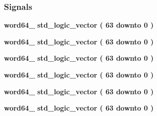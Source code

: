 \subsubsection*{Signals}
 \begin{DoxyCompactItemize}
\item 
{\bf word64\+\_} {\bfseries \textcolor{comment}{std\+\_\+logic\+\_\+vector}\textcolor{vhdlchar}{ }\textcolor{vhdlchar}{(}\textcolor{vhdlchar}{ }\textcolor{vhdlchar}{ } \textcolor{vhdldigit}{63} \textcolor{vhdlchar}{ }\textcolor{keywordflow}{downto}\textcolor{vhdlchar}{ }\textcolor{vhdlchar}{ } \textcolor{vhdldigit}{0} \textcolor{vhdlchar}{ }\textcolor{vhdlchar}{)}\textcolor{vhdlchar}{ }} 
\item 
{\bf word64\+\_} {\bfseries \textcolor{comment}{std\+\_\+logic\+\_\+vector}\textcolor{vhdlchar}{ }\textcolor{vhdlchar}{(}\textcolor{vhdlchar}{ }\textcolor{vhdlchar}{ } \textcolor{vhdldigit}{63} \textcolor{vhdlchar}{ }\textcolor{keywordflow}{downto}\textcolor{vhdlchar}{ }\textcolor{vhdlchar}{ } \textcolor{vhdldigit}{0} \textcolor{vhdlchar}{ }\textcolor{vhdlchar}{)}\textcolor{vhdlchar}{ }} 
\item 
{\bf word64\+\_} {\bfseries \textcolor{comment}{std\+\_\+logic\+\_\+vector}\textcolor{vhdlchar}{ }\textcolor{vhdlchar}{(}\textcolor{vhdlchar}{ }\textcolor{vhdlchar}{ } \textcolor{vhdldigit}{63} \textcolor{vhdlchar}{ }\textcolor{keywordflow}{downto}\textcolor{vhdlchar}{ }\textcolor{vhdlchar}{ } \textcolor{vhdldigit}{0} \textcolor{vhdlchar}{ }\textcolor{vhdlchar}{)}\textcolor{vhdlchar}{ }} 
\item 
{\bf word64\+\_} {\bfseries \textcolor{comment}{std\+\_\+logic\+\_\+vector}\textcolor{vhdlchar}{ }\textcolor{vhdlchar}{(}\textcolor{vhdlchar}{ }\textcolor{vhdlchar}{ } \textcolor{vhdldigit}{63} \textcolor{vhdlchar}{ }\textcolor{keywordflow}{downto}\textcolor{vhdlchar}{ }\textcolor{vhdlchar}{ } \textcolor{vhdldigit}{0} \textcolor{vhdlchar}{ }\textcolor{vhdlchar}{)}\textcolor{vhdlchar}{ }} 
\item 
{\bf word64\+\_} {\bfseries \textcolor{comment}{std\+\_\+logic\+\_\+vector}\textcolor{vhdlchar}{ }\textcolor{vhdlchar}{(}\textcolor{vhdlchar}{ }\textcolor{vhdlchar}{ } \textcolor{vhdldigit}{63} \textcolor{vhdlchar}{ }\textcolor{keywordflow}{downto}\textcolor{vhdlchar}{ }\textcolor{vhdlchar}{ } \textcolor{vhdldigit}{0} \textcolor{vhdlchar}{ }\textcolor{vhdlchar}{)}\textcolor{vhdlchar}{ }} 
\item 
{\bf word64\+\_} {\bfseries \textcolor{comment}{std\+\_\+logic\+\_\+vector}\textcolor{vhdlchar}{ }\textcolor{vhdlchar}{(}\textcolor{vhdlchar}{ }\textcolor{vhdlchar}{ } \textcolor{vhdldigit}{63} \textcolor{vhdlchar}{ }\textcolor{keywordflow}{downto}\textcolor{vhdlchar}{ }\textcolor{vhdlchar}{ } \textcolor{vhdldigit}{0} \textcolor{vhdlchar}{ }\textcolor{vhdlchar}{)}\textcolor{vhdlchar}{ }} 

\end{DoxyCompactItemize}

